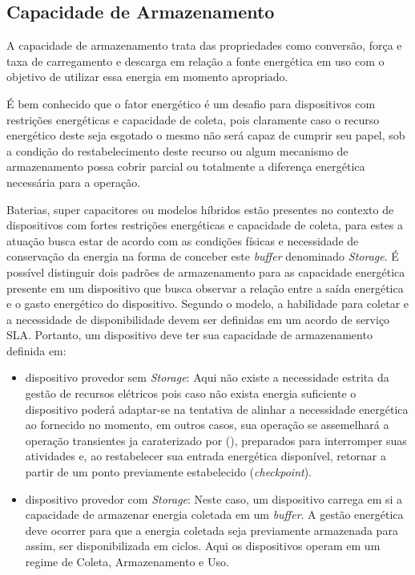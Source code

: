 \subsection{Capacidade de Armazenamento}\label{Capacidade de Armazenamento}
A capacidade de armazenamento trata das propriedades como conversão, força e taxa de carregamento e descarga em relação a fonte energética em uso com o objetivo de utilizar essa energia em momento apropriado. 

É bem conhecido que o fator energético é um desafio para dispositivos com restrições energéticas e capacidade de coleta, pois claramente caso o recurso energético deste seja esgotado o mesmo não será capaz de cumprir seu papel, sob a condição do restabelecimento deste recurso ou algum mecanismo de armazenamento possa cobrir parcial ou totalmente a diferença energética necessária para a operação.

Baterias, super capacitores ou modelos híbridos estão presentes no contexto de dispositivos com fortes restrições energéticas e capacidade de coleta, para estes a atuação busca estar de acordo com as condições físicas e necessidade de conservação da energia na forma de conceber este \textit{buffer} denominado \textit{Storage}. É possível distinguir dois padrões de armazenamento para as capacidade energética presente em um dispositivo que busca observar a relação entre a saída energética e o gasto energético do dispositivo. Segundo o modelo, a habilidade para coletar e a necessidade de disponibilidade devem ser definidas em um acordo de serviço \acs{SLA}. Portanto, um dispositivo deve ter sua capacidade de armazenamento definida em:

\begin{itemize}
    \item dispositivo provedor sem \textit{Storage}: Aqui não existe a necessidade estrita da gestão de recursos elétricos pois caso não exista energia suficiente o dispositivo poderá adaptar-se na tentativa de alinhar a necessidade energética ao fornecido no momento, em outros casos, sua operação se assemelhará a operação transientes ja caraterizado por  \citeauthor{sliper_energy-driven_2020} (\citeyear{sliper_energy-driven_2020}), preparados para interromper suas atividades e, ao restabelecer sua entrada energética disponível, retornar a partir de um ponto previamente estabelecido (\textit{checkpoint}). 
    
    \item dispositivo provedor com \textit{Storage}: Neste caso, um dispositivo carrega em si a capacidade de armazenar energia coletada em um \textit{buffer}. A gestão energética deve ocorrer para que a energia coletada seja previamente armazenada para assim, ser disponibilizada em ciclos. Aqui os dispositivos operam em um regime de Coleta, Armazenamento e Uso.
\end{itemize}

